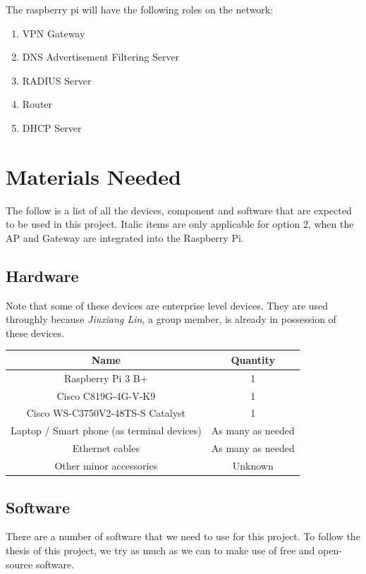 \documentclass[12pt]{article}
\begin{document}
The raspberry pi will have the following roles on the network:

\begin{enumerate}
\item VPN Gateway
\item DNS Advertisement Filtering Server
\item RADIUS Server
\item Router
\item DHCP Server
\end{enumerate}

\section{Materials Needed}

The follow is a list of all the devices, component and software that are expected to be used in this project. Italic items are only applicable for option 2, when the AP and Gateway are integrated into the Raspberry Pi.

\subsection{Hardware}

Note that some of these devices are enterprise level devices. They are used throughly because \textit{Jiuxiang Lin}, a group member, is already in possession of these devices.\\

\begin{tabular}{| c | c |}
\hline
\textbf{Name} & \textbf{Quantity} \\\hline
Raspberry Pi 3 B+ & 1 \\\hline
Cisco C819G-4G-V-K9 & 1 \\\hline
Cisco WS-C3750V2-48TS-S Catalyst & 1 \\\hline
Laptop / Smart phone (as terminal devices) & As many as needed \\\hline
Ethernet cables & As many as needed \\\hline
Other minor accessories & Unknown \\\hline
\end{tabular}

\subsection{Software}

There are a number of software that we need to use for this project. To follow the thesis of this project, we try as much as we can to make use of free and open-source software.
\end{document}
